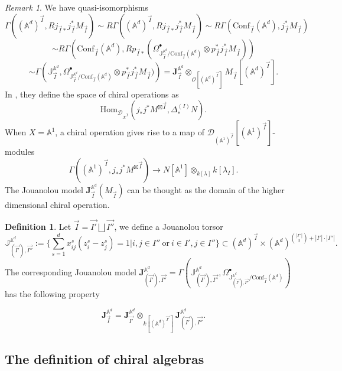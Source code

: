 \documentclass[11pt]{amsart}
\theoremstyle{definition}
\newtheorem{defn}[thm]{Definition}
\theoremstyle{remark}
\newtheorem{rem}[thm]{Remark}
\numberwithin{equation}{section}
\begin{document}
\begin{rem}
    We have quasi-isomorphisms
    $$
\Gamma\left((\mathbb{A}^d)^{\vec{I}},Rj_{\vec{I}*}j^*_{\vec{I}}M_{\vec{I}}\right)\sim R\Gamma\left((\mathbb{A}^d)^{\vec{I}},Rj_{\vec{I}*}j^*_{\vec{I}}M_{\vec{I}}\right)\sim R\Gamma\left(\mathrm{Conf}_{\vec{I}}(\mathbb{A}^d),j^*_{\vec{I}}M_{\vec{I}}\right)
    $$
    $$
    \sim R\Gamma\left(\mathrm{Conf}_{\vec{I}}(\mathbb{A}^d),Rp_{\vec{I}*}(\Omega^{\bullet}_{\mathbb{J}^{\mathbb{A}^d}_{\vec{I}}/\mathrm{Conf}_{\vec{I}}(\mathbb{A}^d)}\otimes p^*_{\vec{I}}j^*_{\vec{I}}M_{\vec{I}})\right)
    $$
    $$
    \sim \Gamma\left(\mathbb{J}^{\mathbb{A}^d}_{\vec{I}},\Omega^{\bullet}_{\mathbb{J}^{\mathbb{A}^d}_{\vec{I}}/\mathrm{Conf}_{\vec{I}}(\mathbb{A}^d)}\otimes p^*_{\vec{I}}j^*_{\vec{I}}M_{\vec{I}}) \right)=\mathbf{J}^{\mathbb{A}^d}_{\vec{I}}\otimes_{\mathcal{O}[(\mathbb{A}^d)^{\vec{I}}]}M_{\vec{I}}[(\mathbb{A}^d)^{\vec{I}}].
    $$
    In \cite{beilinson2004chiral}, they define the space of chiral operations as
    $$
    \mathrm{Hom}_{\mathcal{D}_{X^{\vec{I}}}}\left(j_{*}j^*M^{\boxtimes\vec{I}},\Delta^{(I)}_*N\right).
    $$
    When $X=\mathbb{A}^1$, a chiral operation gives rise to a map of $\mathcal{D}_{(\mathbb{A}^1)^{\vec{I}}}[(\mathbb{A}^1)^{\vec{I}}]$-modules
    $$
    \Gamma\left((\mathbb{A}^1)^{\vec{I}},j_{*}j^*M^{\boxtimes\vec{I}}\right)\rightarrow N[\mathbb{A}^1]\otimes_{k[\lambda]}k[\lambda_I].
    $$
    The Jouanolou model $\mathbf{J}^{\mathbb{A}^d}_{\vec{I}}(M_{\vec{I}})$ can be thought as the domain of the higher dimensional chiral operation.
\end{rem}

\begin{defn}
Let $\vec{I}=\vec{I'}\bigsqcup\vec{I''}$, we define a Jouanolou torsor
$$
\mathbb{J}^{\mathbb{A}^d}_{(\vec{I'}),\vec{I''}}:=\{\sum_{s=1}^d x_{ij}^s(z^s_i-z^s_j)=1|i,j\in I''\ \text{or}\  i\in I', j\in I''\}\subset (\mathbb{A}^d)^{\vec{I}}\times (\mathbb{A}^d)^{\binom{|I''|}{2}+|I'|\cdot |I''|}.
$$
The corresponding Jouanolou model $\mathbf{J}^{\mathbb{A}^d}_{(\vec{I'}),\vec{I''}}=\Gamma(\mathbb{J}^{\mathbb{A}^d}_{(\vec{I'}),\vec{I''}},\Omega^{\bullet}_{\mathbb{J}^{\mathbb{A}^d}_{(\vec{I'}),\vec{I''}}/\mathrm{Conf}_{\vec{I}}(\mathbb{A}^d)})$ has the following property

$$
\mathbf{J}^{\mathbb{A}^d}_{\vec{I}}=\mathbf{J}^{\mathbb{A}^d}_{\vec{I'}}\otimes_{k[(\mathbb{A}^d)^{\vec{I'}}]} \mathbf{J}^{\mathbb{A}^d}_{(\vec{I'}),\vec{I''}}.
$$
\end{defn}

\subsection{The definition of chiral algebras}
\end{document}
